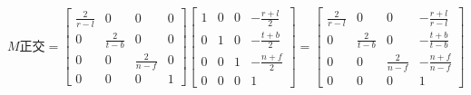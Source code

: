 $$
M正交=
\begin{bmatrix}
  \frac{2}{r-l} & 0 & 0 & 0 \\
  0 & \frac{2}{t-b} & 0 & 0 \\
  0 & 0 & \frac{2}{n-f} & 0 \\
  0 & 0 & 0 & 1
\end{bmatrix}
\begin{bmatrix}
  1 & 0 & 0 & -\frac{r+l}{2} \\
  0 & 1 & 0 & -\frac{t+b}{2} \\
  0 & 0 & 1 & -\frac{n+f}{2} \\
  0 & 0 & 0 & 1
\end{bmatrix}
=
\begin{bmatrix}
  \frac{2}{r-l} & 0 & 0 & -\frac{r+l}{r-l} \\
  0 & \frac{2}{t-b} & 0 & -\frac{t+b}{t-b} \\
  0 & 0 & \frac{2}{n-f} & -\frac{n+f}{n-f} \\
  0 & 0 & 0 & 1
\end{bmatrix}
$$
